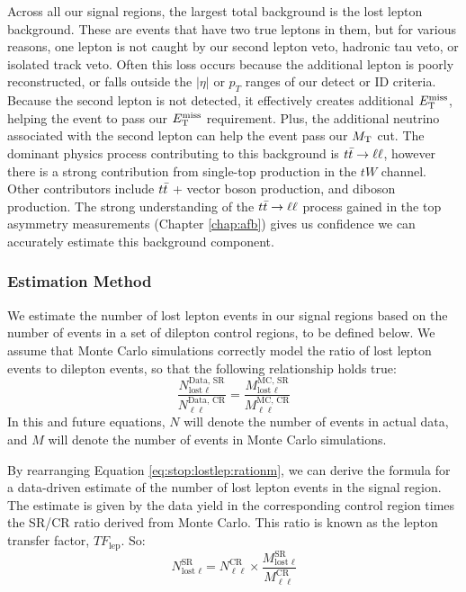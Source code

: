 Across all our signal regions, the largest total background
is the lost lepton background. These are events that have two true
leptons in them, but for various reasons, one lepton is not
caught by our second lepton veto, hadronic tau veto, or isolated track
veto. Often this loss occurs because the additional lepton is poorly
reconstructed, or falls outside the $|\eta|$ or $p_T$ ranges of our
detect or ID criteria. Because the second lepton is not detected, it effectively
creates additional $E_\text{T}^\text{miss}$, helping the event to pass our $E_\text{T}^\text{miss}$
requirement. Plus, the additional neutrino associated with the second
lepton can help the event pass our $M_\text{T}$ cut. The dominant physics
process contributing to this background is $t\bar{t} \rightarrow \ell\ell$, however there
is a strong contribution from single-top production in the $tW$
channel. Other contributors include $t\bar{t}$ + vector boson
production, and diboson production. The strong understanding of the
$t\bar{t} \rightarrow \ell\ell$ process gained in the top asymmetry measurements (Chapter
\ref{chap:afb}) gives us confidence we can accurately estimate this
background component.

\subsubsection{Estimation Method}
\label{sssec:stop:lostlep:estimation}

We estimate the number of lost lepton events in our signal regions
based on the number of events in a set of dilepton control regions, to be
defined below. We assume that Monte Carlo simulations correctly model
the ratio of lost lepton events to dilepton events, so that the
following relationship holds true:
\begin{equation}
\label{eq:stop:lostlep:rationm}
\frac{N_{\text{lost }\ell}^\text{Data, SR}}{N_{\ell\ell}^\text{Data, CR}} =
\frac{M_{\text{lost }\ell}^\text{MC, SR}}{M_{\ell\ell}^\text{MC, CR}}
\end{equation}
In this and future equations, $N$ will denote the number of events in
actual data, and $M$ will denote the number of events in Monte Carlo
simulations.

By rearranging Equation \ref{eq:stop:lostlep:rationm}, we can derive
the formula for a data-driven estimate of the number of lost lepton events in the
signal region. The estimate is given by the data yield in the corresponding control region
times the SR/CR ratio derived from Monte Carlo. This ratio is known as
the lepton transfer factor, $TF_\text{lep}$. So:
\begin{equation}
\label{eq:stop:lostlep:estimate}
N_{\text{lost }\ell}^\text{SR} = N_{\ell\ell}^\text{CR} \times
\frac{M_{\text{lost }\ell}^\text{SR}}{M_{\ell\ell}^\text{CR}}
\end{equation}

